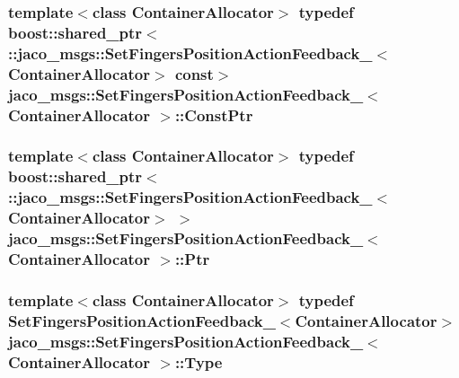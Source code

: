 \subsubsection[{\texorpdfstring{Const\+Ptr}{ConstPtr}}]{\setlength{\rightskip}{0pt plus 5cm}template$<$class Container\+Allocator$>$ typedef boost\+::shared\+\_\+ptr$<$ \+::{\bf jaco\+\_\+msgs\+::\+Set\+Fingers\+Position\+Action\+Feedback\+\_\+}$<$Container\+Allocator$>$ const$>$ {\bf jaco\+\_\+msgs\+::\+Set\+Fingers\+Position\+Action\+Feedback\+\_\+}$<$ Container\+Allocator $>$\+::{\bf Const\+Ptr}}\hypertarget{structjaco__msgs_1_1SetFingersPositionActionFeedback___a7836aaf964ebedaaa25add911ec288ff}{}\label{structjaco__msgs_1_1SetFingersPositionActionFeedback___a7836aaf964ebedaaa25add911ec288ff}
\subsubsection[{\texorpdfstring{Ptr}{Ptr}}]{\setlength{\rightskip}{0pt plus 5cm}template$<$class Container\+Allocator$>$ typedef boost\+::shared\+\_\+ptr$<$ \+::{\bf jaco\+\_\+msgs\+::\+Set\+Fingers\+Position\+Action\+Feedback\+\_\+}$<$Container\+Allocator$>$ $>$ {\bf jaco\+\_\+msgs\+::\+Set\+Fingers\+Position\+Action\+Feedback\+\_\+}$<$ Container\+Allocator $>$\+::{\bf Ptr}}\hypertarget{structjaco__msgs_1_1SetFingersPositionActionFeedback___a635370310b4615d603f3cc6b7ec4e330}{}\label{structjaco__msgs_1_1SetFingersPositionActionFeedback___a635370310b4615d603f3cc6b7ec4e330}
\subsubsection[{\texorpdfstring{Type}{Type}}]{\setlength{\rightskip}{0pt plus 5cm}template$<$class Container\+Allocator$>$ typedef {\bf Set\+Fingers\+Position\+Action\+Feedback\+\_\+}$<$Container\+Allocator$>$ {\bf jaco\+\_\+msgs\+::\+Set\+Fingers\+Position\+Action\+Feedback\+\_\+}$<$ Container\+Allocator $>$\+::{\bf Type}}\hypertarget{structjaco__msgs_1_1SetFingersPositionActionFeedback___ade3db42d18eb3c8f193bde2c56b43491}{}\label{structjaco__msgs_1_1SetFingersPositionActionFeedback___ade3db42d18eb3c8f193bde2c56b43491}


